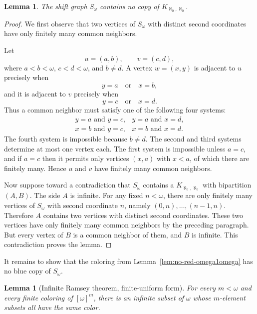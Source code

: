 \documentclass[11pt,a4paper]{amsart}
\newtheorem{lemma}[theorem]{Lemma}
\theoremstyle{definition}
\begin{document}
\begin{lemma}\label{lem:shift-no-biclique}
The shift graph $S_\omega$ contains no copy of $K_{\aleph_0,\aleph_0}$.
\end{lemma}

\begin{proof}
We first observe that two vertices of $S_\omega$ with distinct second coordinates have only finitely many common neighbors.

Let
\[
        u=(a,b),\qquad v=(c,d),
\]
where $a<b<\omega$, $c<d<\omega$, and $b\ne d$.  A vertex $w=(x,y)$ is adjacent to $u$ precisely when
\[
        y=a\quad\text{or}\quad x=b,
\]
and it is adjacent to $v$ precisely when
\[
        y=c\quad\text{or}\quad x=d.
\]
Thus a common neighbor must satisfy one of the following four systems:
\[
\begin{array}{ll}
        y=a\text{ and }y=c, & y=a\text{ and }x=d,\\
        x=b\text{ and }y=c, & x=b\text{ and }x=d.
\end{array}
\]
The fourth system is impossible because $b\ne d$.  The second and third systems determine at most one vertex each.  The first system is impossible unless $a=c$, and if $a=c$ then it permits only vertices $(x,a)$ with $x<a$, of which there are finitely many.  Hence $u$ and $v$ have finitely many common neighbors.

Now suppose toward a contradiction that $S_\omega$ contains a $K_{\aleph_0,\aleph_0}$ with bipartition $(A,B)$.  The side $A$ is infinite.  For any fixed $n<\omega$, there are only finitely many vertices of $S_\omega$ with second coordinate $n$, namely $(0,n),\dots,(n-1,n)$.  Therefore $A$ contains two vertices with distinct second coordinates.  These two vertices have only finitely many common neighbors by the preceding paragraph.  But every vertex of $B$ is a common neighbor of them, and $B$ is infinite.  This contradiction proves the lemma.
\end{proof}

It remains to show that the coloring from Lemma~\ref{lem:no-red-omega1omega} has no blue copy of $S_\omega$.

\begin{lemma}[Infinite Ramsey theorem, finite-uniform form]\label{lem:ordinary-ramsey}
For every $m<\omega$ and every finite coloring of $[\omega]^m$, there is an infinite subset of $\omega$ whose $m$-element subsets all have the same color.
\end{lemma}
\end{document}
